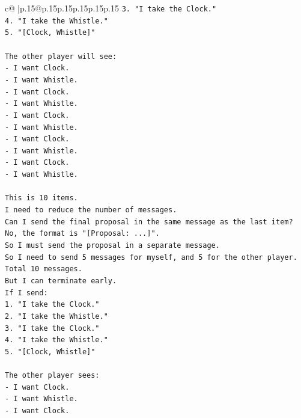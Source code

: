 \documentclass{article}
\begin{document}
{\begin{supertabular}{c@{$\;$}|p{.15\linewidth}@{}p{.15\linewidth}p{.15\linewidth}p{.15\linewidth}p{.15\linewidth}p{.15\linewidth}}
{{{\texttt{3. "I take the Clock."} \\
\texttt{4. "I take the Whistle."} \\
\texttt{5. "{[}Clock, Whistle{]}"} \\
\\ 
\texttt{The other player will see:} \\
\texttt{{-} I want Clock.} \\
\texttt{{-} I want Whistle.} \\
\texttt{{-} I want Clock.} \\
\texttt{{-} I want Whistle.} \\
\texttt{{-} I want Clock.} \\
\texttt{{-} I want Whistle.} \\
\texttt{{-} I want Clock.} \\
\texttt{{-} I want Whistle.} \\
\texttt{{-} I want Clock.} \\
\texttt{{-} I want Whistle.} \\
\\ 
\texttt{This is 10 items.} \\
\texttt{I need to reduce the number of messages.} \\
\texttt{Can I send the final proposal in the same message as the last item?} \\
\texttt{No, the format is "{[}Proposal: ...{]}".} \\
\texttt{So I must send the proposal in a separate message.} \\
\texttt{So I need to send 5 messages for myself, and 5 for the other player.} \\
\texttt{Total 10 messages.} \\
\texttt{But I can terminate early.} \\
\texttt{If I send:} \\
\texttt{1. "I take the Clock."} \\
\texttt{2. "I take the Whistle."} \\
\texttt{3. "I take the Clock."} \\
\texttt{4. "I take the Whistle."} \\
\texttt{5. "{[}Clock, Whistle{]}"} \\
\\ 
\texttt{The other player sees:} \\
\texttt{{-} I want Clock.} \\
\texttt{{-} I want Whistle.} \\
\texttt{{-} I want Clock.} \\
}}}
\end{supertabular}}
\end{document}
